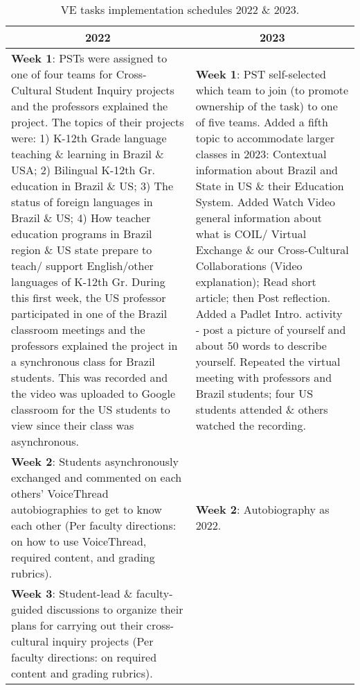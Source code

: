 \begin{table}[htpb]
\centering 
\begin{threeparttable}
\caption{VE tasks implementation schedules 2022 \& 2023.}
\label{tab-02}
\small
\setlength{\tabcolsep}{3pt}
\begin{tabular}{*{2}{p{}}}
\toprule
\multicolumn{1}{c}{2022} & \multicolumn{1}{c}{2023}\\
\midrule
\textbf{Week 1}: PSTs were assigned to one of four teams for Cross-Cultural Student Inquiry projects and the professors explained the project.
The topics of their projects were: 1) K-12th Grade language teaching \& learning in Brazil \& USA; 2) Bilingual K-12th Gr. education in Brazil \& US; 3) The status of foreign languages in Brazil \& US; 4) How teacher education programs in Brazil region \& US state prepare to teach/ support English/other languages of K-12th Gr.
During this first week, the US professor participated in one of the Brazil classroom meetings and the professors explained the project in a synchronous class for Brazil students. This was recorded and the video was uploaded to Google classroom for the US students to view since their class was asynchronous. &
									
\textbf{Week 1}: PST self-selected which team to join (to promote ownership of the task) to one of five teams.
Added a fifth topic to accommodate larger classes in 2023:  Contextual information about Brazil and State in US \& their Education System.
Added Watch Video general information about what is COIL/ Virtual Exchange \& our Cross-Cultural Collaborations (Video explanation); Read short article; then Post reflection.
Added a Padlet Intro. activity - post a picture of yourself and about 50 words to describe yourself.
Repeated the virtual meeting with professors and Brazil students; four US students attended \& others watched the recording. \\
					
\textbf{Week 2}: Students asynchronously exchanged and commented on each others’ VoiceThread autobiographies to get to know each other (Per faculty directions: on how to use VoiceThread, required content, and grading rubrics). &
			
\textbf{Week 2}: Autobiography as 2022. \\
				
\textbf{Week 3}: Student-lead \& faculty-guided discussions to organize their plans for carrying out their cross-cultural inquiry projects (Per faculty directions: on required content and grading rubrics). &
					

\end{tabular}
\end{threeparttable}
\end{table}
